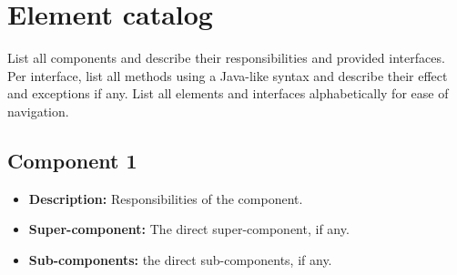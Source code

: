 \documentclass[a4paper,10pt]{article}
\begin{document}
\appendix
\section{Element catalog}\label{app:catalog}
List all components and describe their responsibilities and provided
interfaces.
Per interface, list all methods using a Java-like syntax and describe their
effect and exceptions if any.
List all elements and interfaces alphabetically for ease of navigation.





\subsection{Component 1}
\begin{itemize}
    \item \textbf{Description:} Responsibilities of the component.
    \item \textbf{Super-component:} The direct super-component, if any.
    \item \textbf{Sub-components:} the direct sub-components, if any.
\end{itemize}
\end{document}

